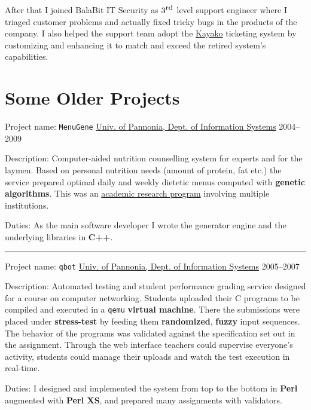 \documentclass[a4paper,12pt]{article}
\newcommand\Yell{\textbf}
\newcommand\Label{\textsf}
\newcommand{\midline}{\rule[0.5ex]{\linewidth-\parindent}{.5pt}}
\begin{document}
\medskip
After that I joined BalaBit IT Security as $3^{\textrm{\small rd}}$ level
support engineer where I triaged customer problems and actually fixed
tricky bugs in the products of the company.  I also helped the support
team adopt the \href{http://www.kayako.com}{Kayako} ticketing system by
customizing and enhancing it to match and exceed the retired system's
capabilities.

\section{Some Older Projects}

\Label{Project name}: \texttt{MenuGene}\hfill
\href{http://virt.uni-pannon.hu/index.php/about-the-department}%
{Univ. of Pannonia, Dept. of Information Systems}
\Label{2004--2009}\par\medskip
\Label{Description}: Computer-aided nutrition counselling system for experts
and for the laymen.  Based on personal nutrition needs (amount of protein,
fat etc.) the service prepared optimal daily and weekly dietetic menus
computed with \Yell{genetic algorithms}.  This was an
\href{http://github.com/enadam/thesis/raw/master/thesis.pdf}%
{academic research program} involving multiple institutions.\par\medskip
\Label{Duties}: As the main software developer I wrote the generator engine
and the underlying libraries in \Yell{C++}.

\midline\par
\Label{Project name}: \texttt{qbot}\hfill
\href{http://virt.uni-pannon.hu/index.php/about-the-department}%
{Univ. of Pannonia, Dept. of Information Systems}
\Label{2005--2007}\par\medskip
\Label{Description}: Automated testing and student performance grading
service designed for a course on computer networking.  Students uploaded
their C programs to be compiled and executed in a \texttt{qemu} \Yell{virtual
machine}.  There the submissions were placed under \Yell{stress-test} by
feeding them \Yell{randomized}, \Yell{fuzzy} input sequences.  The behavior
of the programs was validated against the specification set out in the
assignment.  Through the web interface teachers could supervise everyone's
activity, students could manage their uploads and watch the test execution
in real-time.
\par\medskip
\Label{Duties}: I designed and implemented the system from top to the bottom
in \Yell{Perl} augmented with \Yell{Perl XS}, and prepared many assignments
with validators.
\end{document}
